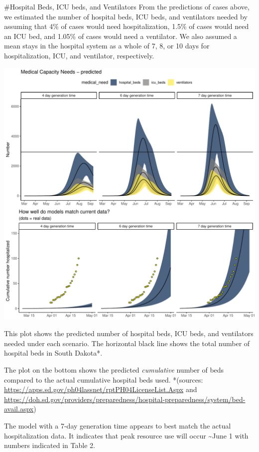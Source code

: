 \documentclass[
]{article}
\begin{document}
\#Hospital Beds, ICU beds, and Ventilators From the predictions of cases
above, we estimated the number of hospital beds, ICU beds, and
ventilators needed by assuming that 4\% of cases would need
hospitalization, 1.5\% of cases would need an ICU bed, and 1.05\% of
cases would need a ventilator. We also assumed a mean stays in the
hospital system as a whole of 7, 8, or 10 days for hospitalization, ICU,
and ventilator, respectively.

\includegraphics{script_SIR_sims_publish_files/figure-latex/unnamed-chunk-8-1.pdf}

This plot shows the predicted number of hospital beds, ICU beds, and
ventilators needed under each scenario. The horizontal black line shows
the total number of hospital beds in South Dakota*.

The plot on the bottom shows the predicted \emph{cumulative} number of
beds compared to the actual cumulative hospital beds used. *(sources:
\url{https://apps.sd.gov/ph04lassnet/rptPH04LicenseList.Aspx} and
\url{https://doh.sd.gov/providers/preparedness/hospital-preparedness/system/bed-avail.aspx})

The model with a 7-day generation time appears to best match the actual
hospitalization data. It indicates that peak resource use will occur
\textasciitilde June 1 with numbers indicated in Table 2.
\end{document}
